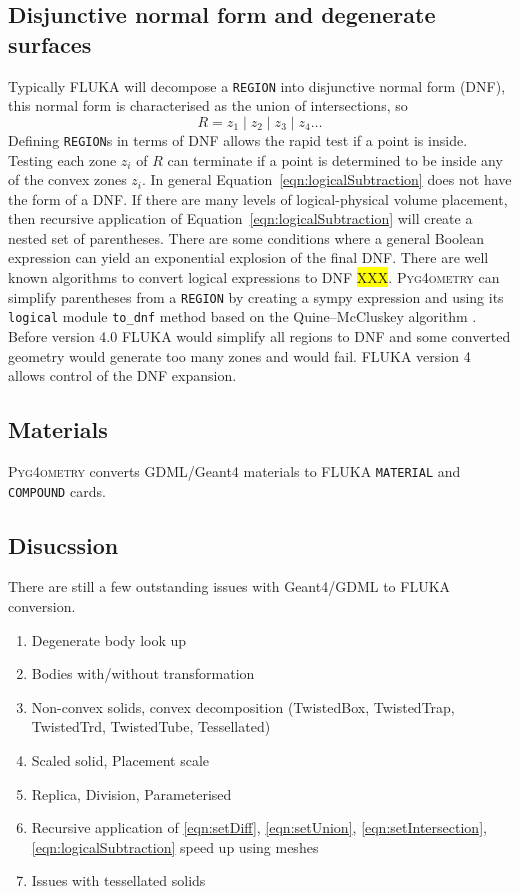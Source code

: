 \documentclass[final,5p,times,twocolumn]{elsarticle}
\newcommand{\PYGEOMETRY}{\textsc{Pyg4ometry}}
\begin{document}
\subsection{Disjunctive normal form and degenerate surfaces}
Typically FLUKA will decompose a \verb|REGION| into disjunctive normal form (DNF), this normal form is 
characterised as the union of intersections, so 
\begin{equation}
R = z_1 \; | \;z_2\;  | \; z_3 	\; | \; z_4 \dots
\end{equation}
Defining \verb|REGION|s in terms of DNF allows the rapid test if a point is inside. Testing each zone 
$z_i$ of $R$ can terminate if a point is determined to be inside any of the convex zones $z_i$. In general 
Equation~\ref{eqn:logicalSubtraction} does not have the form of a DNF. If there are many levels of logical-physical volume 
placement, then recursive application of  Equation~\ref{eqn:logicalSubtraction} will create a nested set of 
parentheses. There are some conditions where a general Boolean expression can yield an exponential 
explosion of the final DNF. There are well known algorithms to convert logical expressions to DNF 
\colorbox{yellow}{XXX}. \PYGEOMETRY{} can simplify parentheses from a \verb|REGION| by creating a 
sympy \cite{10.7717/peerj-cs.103} expression and using its \verb|logical| module \verb|to_dnf| method based on 
the Quine–McCluskey algorithm \cite{6769983}. Before version 4.0 FLUKA  would simplify all regions to 
DNF and some converted geometry would generate too many zones and would fail. FLUKA version 4 
allows control of the DNF expansion.

\subsection{Materials}
\PYGEOMETRY{} converts GDML/Geant4 materials to FLUKA \verb|MATERIAL| and \verb|COMPOUND| cards.

\subsection{Disucssion}
There are still a few outstanding issues with Geant4/GDML to FLUKA conversion. 

\begin{enumerate}
\item Degenerate body look up 
\item Bodies with/without transformation 
\item Non-convex solids, convex decomposition (TwistedBox, TwistedTrap, TwistedTrd, TwistedTube, Tessellated)
\item Scaled solid, Placement scale 
\item Replica, Division, Parameterised
\item Recursive application of \ref{eqn:setDiff}, \ref{eqn:setUnion}, \ref{eqn:setIntersection}, \ref{eqn:logicalSubtraction} speed up using meshes
\item Issues with tessellated solids 
\end{enumerate}
\end{document}
